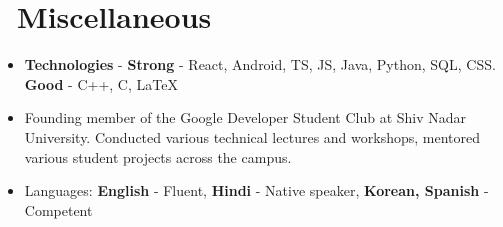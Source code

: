 \documentclass{resume}
\begin{document}
\section{\faInfo\ Miscellaneous}
\begin{itemize}[parsep=0.5ex]
  \item \textbf{Technologies} - \textbf{Strong} - React, Android, TS, JS,  Java, Python, SQL, CSS. \textbf{Good} - C++, C, LaTeX
  \item Founding member of the Google Developer Student Club at Shiv Nadar University. Conducted various technical lectures and workshops, mentored various student projects across the campus.
  \item Languages: \textbf{English} - Fluent, \textbf{Hindi} - Native speaker, \textbf{Korean, Spanish} - Competent
\end{itemize}

%
%
\end{document}
